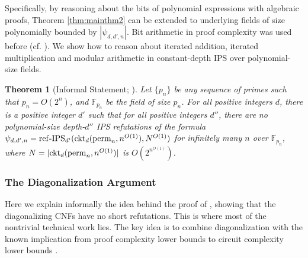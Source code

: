\documentclass[11pt,letter]{article}
\newtheorem{theorem}{Theorem}[section]
\theoremstyle{remark} %
\newcommand{\perm}{{\rm perm}}
\begin{document}
{Specifically, by reasoning about the bits of polynomial expressions with algebraic proofs, Theorem \ref{thm:mainthm2} can be extended to underlying fields of size polynomially bounded by $|\psi_{d,d',n}|$. Bit arithmetic in proof complexity was used before (cf. \cite{Goe90, Bus87, AGHT24, IMP20}). We show how to reason about iterated addition, iterated multiplication and modular arithmetic in constant-depth IPS over polynomial-size fields.

 \begin{theorem}[Informal Statement; ]
     \label{thm:mainthm4}
     Let $\{p_n\}$ be any sequence of primes such that $p_n = O(2^n)$, and $\mathbb{F}_{p_n}$ be the field of size $p_n$. For all positive integers $d$, there is a positive integer $d'$ such that for all positive integers $d''$, there are no polynomial-size depth-$d''$ IPS refutations of the formula $\psi_{d,d',n} = {\rm ref\text{-}IPS}_{d'}({\rm ckt}_d(\perm_n, n^{O(1)}), N^{O(1)})$ for infinitely many $n$ over $\mathbb{F}_{p_n}$, where $N = |{\rm ckt}_d(\perm_n, n^{O(1)})|$ is $O(2^{n^{O(1)}})$.
 \end{theorem}

\vspace{-8pt}

\subsubsection{The Diagonalization Argument}


Here we explain informally the idea behind the proof of , showing that the diagonalizing CNFs have no short refutations. This is where most of the nontrivial technical work lies.
The key idea is to combine diagonalization with the known implication from proof complexity lower bounds to circuit complexity lower bounds \cite{GP18}. 

}
\end{document}
